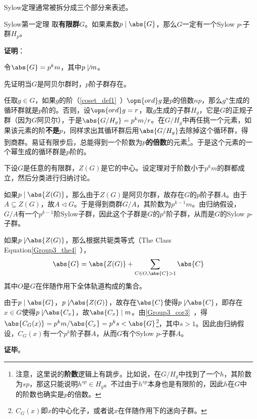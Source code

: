 Sylow定理通常被拆分成三个部分来表述。

\begin{theorem}{Sylow第一定理}
取\textbf{有限群}$G$。如果素数$p\mid\abs{G}$，那么$G$一定有一个Sylow $p$-子群$H_p$。
\end{theorem}

\textbf{证明}：

令$\abs{G}=p^km$，其中$p\not\mid m$。

先证明当$G$是阿贝尔群时，$p$阶子群存在。

任取$g\in G$，如果$g$的阶（\autoref{coset_def1}~）$\opn{ord}g$是$p$的倍数$np$，那么$g^n$生成的循环群就是$p$阶的。否则，设$\opn{ord}g=r$，取$g$生成的子群$H_g$，它是$G$的正规子群（因为$G$阿贝尔），于是$\abs{G/H_g}=p^km/r$。在$G/H_g$中再任挑一个元素，如果该元素的阶\textbf{不是}$p$，同样求出其循环群后用$\abs{G/H_g}$去除掉这个循环群，得到商群。易证有限步后，总能得到一个阶数为$p$\textbf{的倍数}的元素\footnote{注意，这里说的\textbf{阶数}逻辑上有跳步。比如说，在$G/H_g$中找到了一个$h$，其阶数为$sp$，那这只能说明$h^{sp}\in H_g$。不过由于$h^{sp}$本身也是有限阶的，因此$h$在$G$中的阶数也确实是$p$的倍数。}。于是这个元素的一个幂生成的循环群是$p$阶的。

下设$G$是任意的有限群，$Z(G)$是它的中心。设定理对于阶数小于$p^km$的群都成立，然后分类进行归纳讨论。

如果$p\mid \abs{Z(G)}$，那么由于$Z(G)$是阿贝尔群，故存在$G$的$p$阶子群$A$。由于$A\subseteq Z(G)$，故$A\vartriangleleft G$。于是得到商群$G/A$，其阶数为$p^{k-1}m$。由归纳假设，$G/A$有一个$p^{k-1}$阶Sylow子群，因此这个子群是$G$的$p^k$阶子群，从而是$G$的Sylow $p$-子群。

如果$p\not\mid \abs{Z(G)}$，那么根据共轭类等式（The Class Equation\autoref{Group3_the4}~），
\begin{equation}
\abs{G} = \abs{Z(G)} + \sum_{C\in O, \abs{C}>1} \abs{C}
\end{equation}
其中$O$是$G$在伴随作用下全体轨道构成的集合。

由于$p\mid \abs{G}$，$p\not\mid \abs{Z(G)}$，故存在$\abs{C}$使得$p\not\mid \abs{C}$，即存在$x\in G$使得$p\not\mid \abs{C_x}$，故$\abs{C_x}\mid m$。由\autoref{Group3_cor3}~，得$\abs{C_G(x)}=p^km/\abs{C_x}=p^ks<\abs{G}$\footnote{$C_G(x)$即$x$的中心化子，或者说$x$在伴随作用下的迷向子群。}，其中$s>1$。因此由归纳假设，$C_G(x)$有一个$p^k$阶子群$A$，从而$G$有个Sylow $p$-子群$A$。

\textbf{证毕}。





